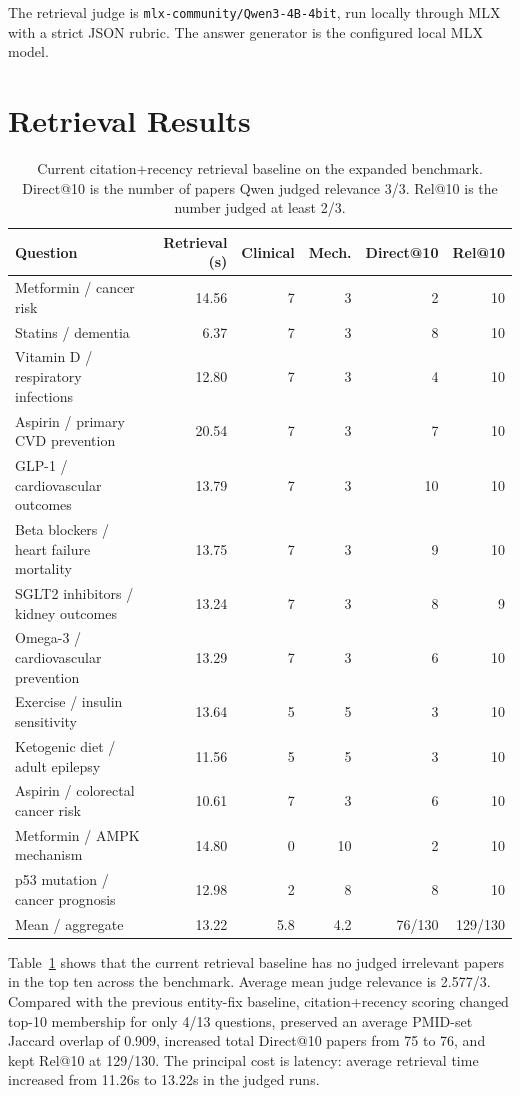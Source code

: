 \documentclass{article}
\begin{document}
The retrieval judge is \texttt{mlx-community/Qwen3-4B-4bit}, run locally through MLX with a strict JSON rubric. The answer generator is the configured local MLX model.

\section{Retrieval Results}

\begin{table}[t]
\centering
\caption{Current citation+recency retrieval baseline on the expanded benchmark. Direct@10 is the number of papers Qwen judged relevance 3/3. Rel@10 is the number judged at least 2/3.}
\label{tab:retrieval}
\begin{tabular}{lrrrrr}
\toprule
Question & Retrieval (s) & Clinical & Mech. & Direct@10 & Rel@10 \\
\midrule
Metformin / cancer risk & 14.56 & 7 & 3 & 2 & 10 \\
Statins / dementia & 6.37 & 7 & 3 & 8 & 10 \\
Vitamin D / respiratory infections & 12.80 & 7 & 3 & 4 & 10 \\
Aspirin / primary CVD prevention & 20.54 & 7 & 3 & 7 & 10 \\
GLP-1 / cardiovascular outcomes & 13.79 & 7 & 3 & 10 & 10 \\
Beta blockers / heart failure mortality & 13.75 & 7 & 3 & 9 & 10 \\
SGLT2 inhibitors / kidney outcomes & 13.24 & 7 & 3 & 8 & 9 \\
Omega-3 / cardiovascular prevention & 13.29 & 7 & 3 & 6 & 10 \\
Exercise / insulin sensitivity & 13.64 & 5 & 5 & 3 & 10 \\
Ketogenic diet / adult epilepsy & 11.56 & 5 & 5 & 3 & 10 \\
Aspirin / colorectal cancer risk & 10.61 & 7 & 3 & 6 & 10 \\
Metformin / AMPK mechanism & 14.80 & 0 & 10 & 2 & 10 \\
p53 mutation / cancer prognosis & 12.98 & 2 & 8 & 8 & 10 \\
\midrule
Mean / aggregate & 13.22 & 5.8 & 4.2 & 76/130 & 129/130 \\
\bottomrule
\end{tabular}
\end{table}

Table~\ref{tab:retrieval} shows that the current retrieval baseline has no judged irrelevant papers in the top ten across the benchmark. Average mean judge relevance is 2.577/3. Compared with the previous entity-fix baseline, citation+recency scoring changed top-10 membership for only 4/13 questions, preserved an average PMID-set Jaccard overlap of 0.909, increased total Direct@10 papers from 75 to 76, and kept Rel@10 at 129/130. The principal cost is latency: average retrieval time increased from 11.26s to 13.22s in the judged runs.
\end{document}
